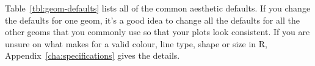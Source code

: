 % 


Table~\ref{tbl:geom-defaults} lists all of the common aesthetic defaults.  If you change the defaults for one geom, it's a good idea to change all the defaults for all the other geoms that you commonly use so that your plots look consistent.  If you are unsure on what makes for a valid colour, line type, shape or size in R, Appendix~\ref{cha:specifications} gives the details.

% 

